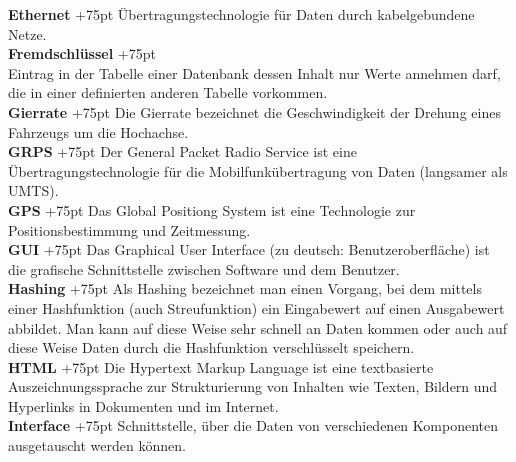 \documentclass[fontsize = 12pt, paper = a4]{scrreprt}
\begin{document}
\textbf{Ethernet}
\hangindent+75pt 
\hspace*{5.5mm}
Übertragungstechnologie für Daten durch kabelgebundene Netze.\\

\textbf{Fremdschlüssel}
\hangindent+75pt 
\\
Eintrag in der Tabelle einer Datenbank dessen Inhalt nur Werte annehmen darf, die in einer definierten anderen Tabelle vorkommen.\\

\textbf{Gierrate}
\hangindent+75pt 
\hspace*{6.5mm}
Die Gierrate bezeichnet die Geschwindigkeit der Drehung eines Fahrzeugs um die Hochachse.\\

\textbf{GRPS}
\hangindent+75pt 
\hspace*{10.5mm}
Der General Packet Radio Service ist eine Übertragungstechnologie für die Mobilfunkübertragung von Daten (langsamer als UMTS).\\

\textbf{GPS}
\hangindent+75pt 
\hspace*{14mm}
Das Global Positiong System ist eine Technologie zur Positionsbestimmung und Zeitmessung.\\

\textbf{GUI}
\hangindent+75pt 
\hspace*{14.5mm}
Das Graphical User Interface (zu deutsch: Benutzeroberfläche) ist die grafische Schnittstelle zwischen Software und dem Benutzer.\\

\textbf{Hashing}
\hangindent+75pt   
\hspace*{6.5mm}
Als Hashing bezeichnet man einen Vorgang, bei dem mittels einer Hashfunktion (auch Streufunktion) ein Eingabewert auf einen Ausgabewert abbildet. Man kann auf diese Weise sehr schnell an Daten kommen oder auch auf diese Weise Daten durch die Hashfunktion verschlüsselt speichern.\\

\textbf{HTML}
\hangindent+75pt 
\hspace*{9mm}
Die Hypertext Markup Language ist eine textbasierte Auszeichnungssprache zur Strukturierung von Inhalten wie Texten, Bildern und Hyperlinks in Dokumenten und im Internet.\\

\textbf{Interface}
\hangindent+75pt 
\hspace*{6mm}
Schnittstelle, über die Daten von verschiedenen Komponenten ausgetauscht werden können.\\
\end{document}
